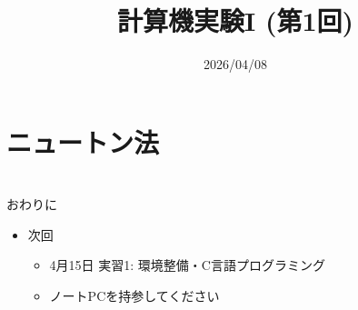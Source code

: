 \documentclass[10pt,dvipdfmx]{beamer}
\title{計算機実験I (第1回)}
\date{2026/04/08}
\begin{document}
\begin{frame}
  \titlepage
  \tableofcontents
\end{frame}








\section{ニュートン法}














\section{}
\begin{frame}[t]{おわりに}
  \begin{itemize}
  \item 次回
    \begin{itemize}
    \item 4月15日 実習1: 環境整備・C言語プログラミング
    \item ノートPCを持参してください
    \end{itemize}
  \end{itemize}
\end{frame}
\end{document}
